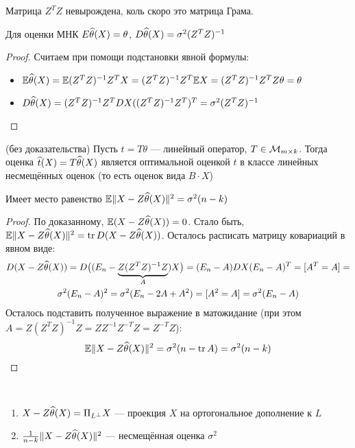 \begin{note}
	Матрица $Z^TZ$ невырождена, коль скоро это матрица Грама.
\end{note}

\begin{proposition}
	Для оценки МНК $E \widehat{\theta}(X) = \theta$, $D \widehat{\theta}(X) = \sigma^2(Z^TZ)^{-1}$
\end{proposition}

\begin{proof}
	Считаем при помощи подстановки явной формулы:
	\begin{itemize}
		\item $\mathbb{E} \widehat{\theta}(X) = \mathbb{E} (Z^TZ)^{-1}Z^TX = (Z^TZ)^{-1}Z^T\mathbb{E} X = (Z^TZ)^{-1}Z^TZ\theta = \theta$
		
		\item $D \widehat{\theta}(X) = (Z^TZ)^{-1}Z^T DX ((Z^TZ)^{-1}Z^T)^T = \sigma^2(Z^TZ)^{-1}$
	\end{itemize}
\end{proof}

\begin{theorem} (без доказательства)
	Пусть $t = T\theta$ --- линейный оператор, $T \in \mathcal{M}_{m \times k}$. Тогда оценка $\widehat{t}(X) = T\widehat{\theta}(X)$ является оптимальной оценкой $t$ в классе линейных несмещённых оценок (то есть оценок вида $B \cdot X$)
\end{theorem}

\begin{lemma}
	Имеет место равенство $\mathbb{E} \|X - Z\widehat{\theta}(X)\|^2 = \sigma^2(n - k)$
\end{lemma}

\begin{proof}
	По доказанному, $\mathbb{E} (X - Z\widehat{\theta}(X)) = 0$. Стало быть, $\mathbb{E} \|X - Z\widehat{\theta}(X)\|^2 = \operatorname{tr} D(X - Z\widehat{\theta}(X))$. Осталось расписать матрицу ковариаций в явном виде:
	\begin{multline*}
		D(X - Z\widehat{\theta}(X)) = D\big((E_n - \underbrace{Z(Z^TZ)^{-1}Z}_{A})X\big) = (E_n - A) DX (E_n - A)^T = [A^T = A] =
		\\
		\sigma^2 (E_n - A)^2 = \sigma^2(E_n - 2A + A^2) = [A^2 = A] = \sigma^2(E_n - A)
	\end{multline*}
	Осталось подставить полученное выражение в матожидание (при этом $A = Z(Z^TZ)^{-1}Z = ZZ^{-1}Z^{-T}Z = Z^{-T}Z$):
	\[
		\mathbb{E} \|X - Z\widehat{\theta}(X)\|^2 = \sigma^2(n - \operatorname{tr} A) = \sigma^2(n - k)
	\]
\end{proof}

\begin{corollary}~
	\begin{enumerate}
		\item $X - Z\widehat{\theta}(X) = \Pi_{L^\bot} X$ --- проекция $X$ на ортогональное дополнение к $L$
		
		\item $\frac{1}{n - k} \|X - Z\widehat{\theta}(X)\|^2$ --- несмещённая оценка $\sigma^2$
	\end{enumerate}
\end{corollary}

